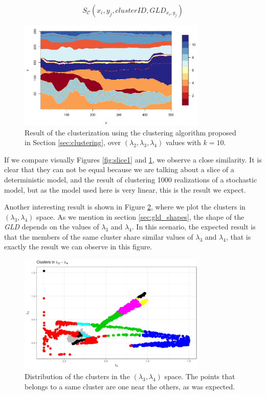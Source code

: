 \begin{equation}\label{eq:clustersresult}
S_{\mathcal{C}}(x_{i},y_{j},clusterID, GLD_{x_{i},y_{j}})
\end{equation}

\begin{figure}[H]
    \centering
    \includegraphics[width=0.8\textwidth]{images/clusters1.png}
    \caption{Result of the clusterization using the clustering algorithm proposed in Section \ref{sec:clustering}, over $(\lambda_{2}, \lambda_{3}, \lambda_{4})$ values with $k=10$.}
    \label{fig:clusters}
\end{figure}

If we compare visually Figures \ref{fig:slice1} and \ref{fig:clusters}, we observe a close similarity. It is clear that they can not be equal because we are talking about a slice of a deterministic model, and the result of clustering 1000 realizations of a stochastic model, but as the model used here is very linear, this is the result we expect.

Another interesting result is shown in Figure \ref{fig:clusters_lambda3_lambda4_space}, where we plot the clusters in $(\lambda_{3}, \lambda_{4})$ space. As we mention in section \ref{sec:gld_shapes}, the shape of the \textit{GLD} depends on the values of $\lambda_{3}$ and $\lambda_{4}$. In this scenario, the expected result is that the members of the same cluster share similar values of $\lambda_{3}$ and $\lambda_{4}$, that is exactly the result we can observe in this figure. 

\begin{figure}[H]
    \centering
    \includegraphics[width=0.8\textwidth]{img/use_cases/case_study_I/Clusters_lambda3_lambda4_v3.png}
    \caption{Distribution of the clusters in the $(\lambda_{3}, \lambda_{4})$ space. The points that belongs to a same cluster are one near the others, as was expected.}
    \label{fig:clusters_lambda3_lambda4_space}
\end{figure}

